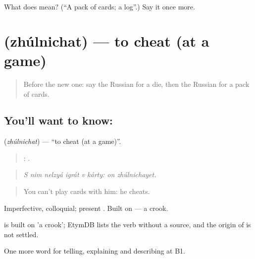 \begin{tcolorbox}[breakable,colback=teal!4,colframe=teal!35!black,title={Before you move on}]
What does  mean? (\textquotedblleft{}A pack of cards; a log\textquotedblright{}.) Say it once more.
\end{tcolorbox}
\section[\texorpdfstring{\ru{жульничать} (zhúlnichat)}{жульничать (zhúlnichat)}]{ (zhúlnichat) — to cheat (at a game)}

\label{lesson:RU-C504-zhulnichat}



\begin{quote}
Before the new one: say the Russian for a die, then the Russian for a pack of cards.
\end{quote}

\subsection*{You'll want to know: }
\textbf{} (\emph{zhúlnichat}) — \textquotedblleft{}to cheat (at a game)\textquotedblright{}.

\begin{quote}
     :  .
\end{quote}

\begin{quote}
\emph{S nim nelzyá igrát v kárty: on zhúlnichayet.}
\end{quote}

\begin{quote}
You can't play cards with him: he cheats.
\end{quote}

Imperfective, colloquial; present . Built on \emph{} — a crook.

\begin{cousinweb}
\emph{} is built on \emph{} 'a crook'; EtymDB lists the verb without a source, and the origin of \emph{} is not settled.
\end{cousinweb}

\begin{grammarlens}[title={What you've built}]
One more word for telling, explaining and describing at B1.
\end{grammarlens}

